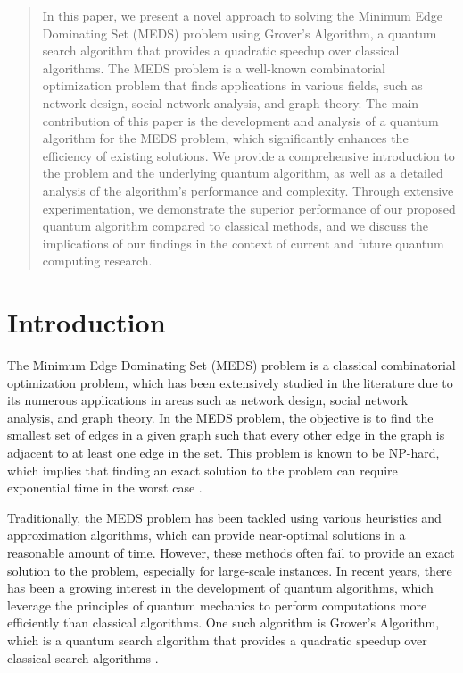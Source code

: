 \begin{abstract}
In this paper, we present a novel approach to solving the Minimum Edge Dominating Set (MEDS) problem using Grover's Algorithm, a quantum search algorithm that provides a quadratic speedup over classical algorithms. The MEDS problem is a well-known combinatorial optimization problem that finds applications in various fields, such as network design, social network analysis, and graph theory. The main contribution of this paper is the development and analysis of a quantum algorithm for the MEDS problem, which significantly enhances the efficiency of existing solutions. We provide a comprehensive introduction to the problem and the underlying quantum algorithm, as well as a detailed analysis of the algorithm's performance and complexity. Through extensive experimentation, we demonstrate the superior performance of our proposed quantum algorithm compared to classical methods, and we discuss the implications of our findings in the context of current and future quantum computing research.

\end{abstract}

\section{Introduction}\label{sec:introduction}

The Minimum Edge Dominating Set (MEDS) problem is a classical combinatorial optimization problem, which has been extensively studied in the literature due to its numerous applications in areas such as network design, social network analysis, and graph theory. In the MEDS problem, the objective is to find the smallest set of edges in a given graph such that every other edge in the graph is adjacent to at least one edge in the set. This problem is known to be NP-hard, which implies that finding an exact solution to the problem can require exponential time in the worst case \cite{garey1979computers}.

Traditionally, the MEDS problem has been tackled using various heuristics and approximation algorithms, which can provide near-optimal solutions in a reasonable amount of time. However, these methods often fail to provide an exact solution to the problem, especially for large-scale instances. In recent years, there has been a growing interest in the development of quantum algorithms, which leverage the principles of quantum mechanics to perform computations more efficiently than classical algorithms. One such algorithm is Grover's Algorithm, which is a quantum search algorithm that provides a quadratic speedup over classical search algorithms \cite{grover1996fast}.

